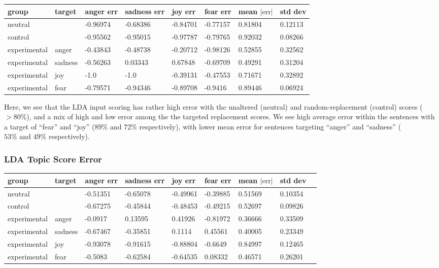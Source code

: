 \documentclass[11pt, twoside, reqno]{book}
\begin{document}
\begin{tabular}{|l|l|l|l|l|l|l|l|}
\hline
    group & target & anger err & sadness err & joy err & fear err & mean $|\text{err}|$ & std dev \\ \hline
    neutral &  & -0.96974 & -0.68386 & -0.84701 & -0.77157 & 0.81804 & 0.12113 \\ \hline
    control &  & -0.95562 & -0.95015 & -0.97787 & -0.79765 & 0.92032 & 0.08266 \\ \hline
    experimental & anger & -0.43843 & -0.48738 & -0.20712 & -0.98126 & 0.52855 & 0.32562 \\ \hline
    experimental & sadness & -0.56263 & 0.03343 & 0.67848 & -0.69709 & 0.49291 & 0.31204 \\ \hline
    experimental & joy & -1.0 & -1.0 & -0.39131 & -0.47553 & 0.71671 & 0.32892 \\ \hline
    experimental & fear & -0.79571 & -0.94346 & -0.89708 & -0.9416 & 0.89446 & 0.06924 \\ \hline
\end{tabular}
\vspace{16pt}

Here, we see that the LDA input scoring has rather high error with the unaltered (neutral) and random-replacement (control) scores ($>80\%$), and a mix of high and low error among the the targeted replacement scores. We see high average error within the sentences with a target of ``fear'' and ``joy'' ($89\% \text{ and } 72\%$ respectively), with lower mean error for sentences targeting ``anger'' and ``sadness'' ($53\% \text{ and } 49\%$ respectively).

\subsubsection{\textbf{LDA Topic Score Error}}

\begin{tabular}{|l|l|l|l|l|l|l|l|l|}
\hline
    group & target & anger err & sadness err & joy err & fear err & mean $|\text{err}|$ & std dev  \\ \hline
    neutral &  & -0.51351 & -0.65078 & -0.49961 & -0.39885 & 0.51569 & 0.10354  \\ \hline
    control &  & -0.67275 & -0.45844 & -0.48453 & -0.49215 & 0.52697 & 0.09826  \\ \hline
    experimental & anger & -0.0917 & 0.13595 & 0.41926 & -0.81972 & 0.36666 & 0.33509  \\ \hline
    experimental & sadness & -0.67467 & -0.35851 & 0.1114 & 0.45561 & 0.40005 & 0.23349  \\ \hline
    experimental & joy & -0.93078 & -0.91615 & -0.88804 & -0.6649 & 0.84997 & 0.12465  \\ \hline
    experimental & fear & -0.5083 & -0.62584 & -0.64535 & 0.08332 & 0.46571 & 0.26201  \\ \hline
\end{tabular}
\vspace{16pt}
\end{document}
